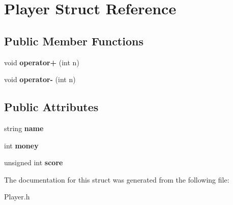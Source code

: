 \hypertarget{struct_player}{}\section{Player Struct Reference}
\label{struct_player}
\subsection*{Public Member Functions}
\begin{DoxyCompactItemize}
\item 
\hypertarget{struct_player_ac13db53be14f078b1c7e9e4750f21ac6}{}\label{struct_player_ac13db53be14f078b1c7e9e4750f21ac6} 
void {\bfseries operator+} (int n)
\item 
\hypertarget{struct_player_add3e9da9c3925ecab8ccd15c1d14ef52}{}\label{struct_player_add3e9da9c3925ecab8ccd15c1d14ef52} 
void {\bfseries operator-\/} (int n)
\end{DoxyCompactItemize}
\subsection*{Public Attributes}
\begin{DoxyCompactItemize}
\item 
\hypertarget{struct_player_acf0355128a99ee20ad9931b760fb2de1}{}\label{struct_player_acf0355128a99ee20ad9931b760fb2de1} 
string {\bfseries name}
\item 
\hypertarget{struct_player_a9545beef70350d5c3b3a5719a890dd2f}{}\label{struct_player_a9545beef70350d5c3b3a5719a890dd2f} 
int {\bfseries money}
\item 
\hypertarget{struct_player_a38a6dafe988a768a435cc0a9fde38e46}{}\label{struct_player_a38a6dafe988a768a435cc0a9fde38e46} 
unsigned int {\bfseries score}
\end{DoxyCompactItemize}


The documentation for this struct was generated from the following file\+:\begin{DoxyCompactItemize}
\item 
Player.\+h\end{DoxyCompactItemize}
